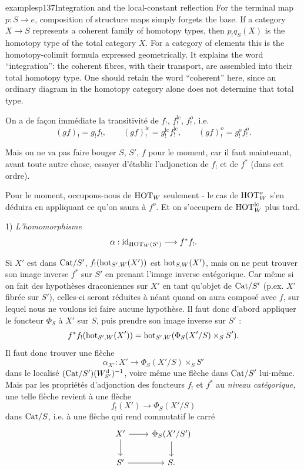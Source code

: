 \begin{dcomment}{examples}{p137}{Integration and the local-constant reflection}
For the terminal map $p:S\to e$, composition of structure maps simply forgets the base. If a category $X\to S$ represents a coherent family of homotopy types, then $p_!q_S(X)$ is the homotopy type of the total category $X$. For a category of elements this is the homotopy-colimit formula expressed geometrically. It explains the word ``integration'': the coherent fibres, with their transport, are assembled into their total homotopy type. One should retain the word ``coherent'' here, since an ordinary diagram in the homotopy category alone does not determine that total type.
\end{dcomment}


On a de façon immédiate la transitivité de $f_!$, $f_!^{\mathrm{lc}}$, $f_!^{o}$, i.e.
\[
(gf)_! = g_!f_!, \qquad (gf)_!^{\mathrm{lc}} = g_!^{\mathrm{lc}}f_!^{\mathrm{lc}}, \qquad (gf)_!^{o} = g_!^{o}f_!^{o}.
\]

Mais on ne va pas faire bouger $S$, $S'$, $f$ pour le moment, car il faut maintenant, avant toute autre chose, essayer d'établir l'adjonction de $f_!$ et de $f^*$ (dans cet ordre).

Pour le moment, occupons-nous de $\mathrm{HOT}_W$ seulement - le cas de $\mathrm{HOT}_W^{o}$ s'en déduira en appliquant ce qu'on saura à $f^{o}$. Et on s'occupera de $\mathrm{HOT}_W^{\mathrm{lc}}$ plus tard.

1) \textit{L'homomorphisme}
\[
\alpha : \mathrm{id}_{\mathrm{HOT}_W(S')} \longrightarrow f^*f_!.
\]

Si $X'$ est dans $\mathrm{Cat}/S'$, $f_!(\mathrm{hot}_{S',W}(X'))$ est $\mathrm{hot}_{S,W}(X')$, mais on ne peut trouver son image inverse $f^*$ sur $S'$ en prenant l'image inverse catégorique. Car même si on fait des hypothèses draconiennes sur $X'$ en tant qu'objet de $\mathrm{Cat}/S'$ (p.ex. $X'$ fibrée sur $S'$), celles-ci seront réduites à néant quand on aura composé avec $f$, sur lequel nous ne voulons ici faire aucune hypothèse. Il faut donc d'abord appliquer le foncteur $\Phi_S$ à $X'$ sur $S$, puis prendre son image inverse sur $S'$ :
\[
f^*f_!(\mathrm{hot}_{S',W}(X')) = \mathrm{hot}_{S',W}(\Phi_S(X'/S)\times_S S').
\]
Il faut donc trouver une flèche
\[
\alpha_{X'} : X' \longrightarrow \Phi_S(X'/S)\times_S S'
\]
dans le localisé $(\mathrm{Cat}/S')(W^{\mathrm{d}}_{S'})^{-1}$, voire même une flèche dans $\mathrm{Cat}/S'$ lui-même. Mais par les propriétés d'adjonction des foncteurs $f_!$ et $f^*$ au \textit{niveau catégorique,} une telle flèche revient à une flèche
\[
f_!(X') \longrightarrow \Phi_S(X'/S)
\]
dans $\mathrm{Cat}/S$, i.e. à une flèche qui rend commutatif le carré
\[
\begin{tikzcd}
X' \arrow[r] \arrow[d] & \Phi_S(X'/S') \arrow[d] \\ %
S' \arrow[r] & S.
\end{tikzcd}
\]

